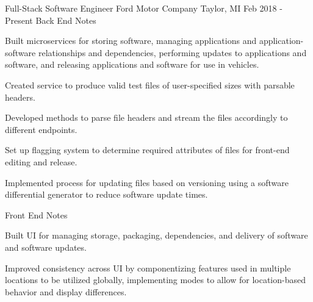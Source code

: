 


\begin{cventries}


\cventry
{Full-Stack Software Engineer} %
{Ford Motor Company } %
{Taylor, MI} %
{Feb 2018 - Present} { }%
\vskip -4.5mm
\cventry
{Back End Notes} {}{} {} %
{ %
\begin{cvitems}
\item {Built microservices for storing software, managing applications and application-software relationships and dependencies, performing updates to applications and software, and releasing applications and software for use in vehicles.}
\item {Created service to produce valid test files of user-specified sizes with parsable headers.}
\item {Developed methods to parse file headers and stream the files accordingly to different endpoints.}
\item {Set up flagging system to determine required attributes of files for front-end editing and release.}
\item {Implemented process for updating files based on versioning using a software differential generator to reduce software update times.}
\end{cvitems}
}
\vskip -0.5mm
\cventry
{Front End Notes} {}{} {} %
{ %
\begin{cvitems}
\item {Built UI for managing storage, packaging, dependencies, and delivery of software and software updates.}
\item {Improved consistency across UI by componentizing features used in multiple locations to be utilized globally, implementing modes to allow for location-based behavior and display differences.}

\end{cvitems}}
\end{cventries}
